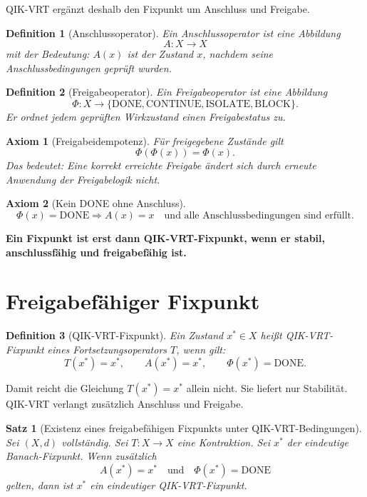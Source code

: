 \documentclass[11pt,a4paper,oneside]{scrartcl}
\theoremstyle{qikstyle}
\newtheorem{definition}{Definition}[section]
\newtheorem{axiom}{Axiom}
\newtheorem{satz}{Satz}[section]
\newcommand{\DONE}{\mathrm{DONE}}
\newcommand{\CONTINUE}{\mathrm{CONTINUE}}
\newcommand{\ISOLATE}{\mathrm{ISOLATE}}
\newcommand{\BLOCK}{\mathrm{BLOCK}}
\newcommand{\Phiop}{\Phi}
\newenvironment{merksatz}{\begin{center}\begin{minipage}{0.92\linewidth}\sffamily\bfseries}{\end{minipage}\end{center}}
\begin{document}
QIK-VRT ergänzt deshalb den Fixpunkt um Anschluss und Freigabe.

\begin{definition}[Anschlussoperator]
Ein Anschlussoperator ist eine Abbildung
\[
A:X\to X
\]
mit der Bedeutung: \(A(x)\) ist der Zustand \(x\), nachdem seine Anschlussbedingungen geprüft wurden.
\end{definition}

\begin{definition}[Freigabeoperator]
Ein Freigabeoperator ist eine Abbildung
\[
\Phiop:X\to \{\DONE,\CONTINUE,\ISOLATE,\BLOCK\}.
\]
Er ordnet jedem geprüften Wirkzustand einen Freigabestatus zu.
\end{definition}

\begin{axiom}[Freigabeidempotenz]
Für freigegebene Zustände gilt
\[
\Phiop(\Phiop(x))=\Phiop(x).
\]
Das bedeutet: Eine korrekt erreichte Freigabe ändert sich durch erneute Anwendung der Freigabelogik nicht.
\end{axiom}

\begin{axiom}[Kein DONE ohne Anschluss]
\[
\Phiop(x)=\DONE \Rightarrow A(x)=x \quad \text{und alle Anschlussbedingungen sind erfüllt.}
\]
\end{axiom}

\begin{merksatz}
Ein Fixpunkt ist erst dann QIK-VRT-Fixpunkt, wenn er stabil, anschlussfähig und freigabefähig ist.
\end{merksatz}
\newpage

\section{Freigabefähiger Fixpunkt}

\begin{definition}[QIK-VRT-Fixpunkt]
Ein Zustand \(x^*\in X\) heißt QIK-VRT-Fixpunkt eines Fortsetzungsoperators \(T\), wenn gilt:
\[
T(x^*)=x^*,\qquad A(x^*)=x^*,\qquad \Phiop(x^*)=\DONE.
\]
\end{definition}

Damit reicht die Gleichung \(T(x^*)=x^*\) allein nicht. Sie liefert nur Stabilität. QIK-VRT verlangt zusätzlich Anschluss und Freigabe.

\begin{satz}[Existenz eines freigabefähigen Fixpunkts unter QIK-VRT-Bedingungen]
Sei \((X,d)\) vollständig. Sei \(T:X\to X\) eine Kontraktion. Sei \(x^*\) der eindeutige Banach-Fixpunkt. Wenn zusätzlich
\[
A(x^*)=x^* \quad \text{und} \quad \Phiop(x^*)=\DONE
\]
gelten, dann ist \(x^*\) ein eindeutiger QIK-VRT-Fixpunkt.
\end{satz}
\end{document}

